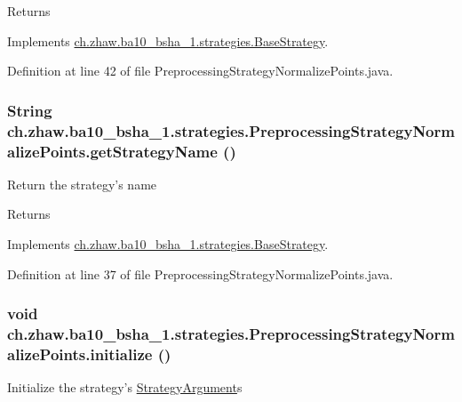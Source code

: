 \begin{DoxyReturn}{Returns}

\end{DoxyReturn}


Implements \hyperlink{classch_1_1zhaw_1_1ba10__bsha__1_1_1strategies_1_1BaseStrategy_a75fdb36932ad701f6375cc1fe718056b}{ch.zhaw.ba10\_\-bsha\_\-1.strategies.BaseStrategy}.

Definition at line 42 of file PreprocessingStrategyNormalizePoints.java.\hypertarget{classch_1_1zhaw_1_1ba10__bsha__1_1_1strategies_1_1PreprocessingStrategyNormalizePoints_ac9826f8ef875b62955887e6f3ffe7cff}{
\subsubsection[{getStrategyName}]{\setlength{\rightskip}{0pt plus 5cm}String ch.zhaw.ba10\_\-bsha\_\-1.strategies.PreprocessingStrategyNormalizePoints.getStrategyName ()}}
\label{classch_1_1zhaw_1_1ba10__bsha__1_1_1strategies_1_1PreprocessingStrategyNormalizePoints_ac9826f8ef875b62955887e6f3ffe7cff}
Return the strategy's name

\begin{DoxyReturn}{Returns}

\end{DoxyReturn}


Implements \hyperlink{classch_1_1zhaw_1_1ba10__bsha__1_1_1strategies_1_1BaseStrategy_aa0ebed55eed45409bad13d43a0058780}{ch.zhaw.ba10\_\-bsha\_\-1.strategies.BaseStrategy}.

Definition at line 37 of file PreprocessingStrategyNormalizePoints.java.\hypertarget{classch_1_1zhaw_1_1ba10__bsha__1_1_1strategies_1_1PreprocessingStrategyNormalizePoints_a933e6d434685d7273ddf132419f8738b}{
\subsubsection[{initialize}]{\setlength{\rightskip}{0pt plus 5cm}void ch.zhaw.ba10\_\-bsha\_\-1.strategies.PreprocessingStrategyNormalizePoints.initialize ()}}
\label{classch_1_1zhaw_1_1ba10__bsha__1_1_1strategies_1_1PreprocessingStrategyNormalizePoints_a933e6d434685d7273ddf132419f8738b}
Initialize the strategy's \hyperlink{classch_1_1zhaw_1_1ba10__bsha__1_1_1StrategyArgument}{StrategyArgument}s 

